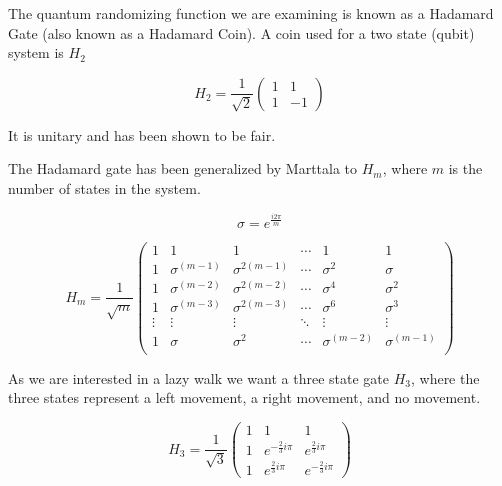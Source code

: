 \documentclass[a0,portrait]{a0poster}
\begin{document}
\begin{center}
{The quantum randomizing function we are examining is known as a Hadamard Gate (also known as a Hadamard Coin). A coin used for a two state (qubit) system is $H_2$ 

\begin{equation}
H_2 = \dfrac{1}{\sqrt{2}} \begin{pmatrix}
  1 & 1 \\
  1 & -1 
\end{pmatrix}
\label{eq:1}
\end{equation}

It is unitary and has been shown\cite{Ke:2003} to be fair. 

The Hadamard gate has been generalized by Marttala\cite{Ma:2007} to $H_m$, where $m$ is the number of states in the system. 

\begin{equation}
\sigma = e^\frac{i2\pi}{m}
\label{eq:2}
\end{equation}

\begin{equation}
H_m = \dfrac{1}{\sqrt{m}} \begin{pmatrix}
  1 & 1 & 1 & \cdots & 1 & 1 \\
  1 & \sigma^{(m-1)} & \sigma^{2(m-1)} & \cdots & \sigma^2 & \sigma \\
  1 & \sigma^{(m-2)} & \sigma^{2(m-2)} & \cdots & \sigma^4 & \sigma^2 \\
  1 & \sigma^{(m-3)} & \sigma^{2(m-3)} & \cdots & \sigma^6 & \sigma^3 \\
  \vdots  & \vdots  & \vdots  & \ddots & \vdots  & \vdots  \\
  1 & \sigma & \sigma^2 & \cdots & \sigma^{(m-2)} & \sigma^{(m-1)} \\
\end{pmatrix}
\label{eq:3}
\end{equation}

As we are interested in a lazy walk we want a three state gate $H_3$, where the three states represent a left movement, a right movement, and no movement.

\begin{equation}
H_3 = \dfrac{1}{\sqrt{3}} \begin{pmatrix}
  1 & 1 & 1 \\
  1 & e^{-\frac{2}{3}i\pi} & e^{\frac{2}{3}i\pi} \\
  1 & e^{\frac{2}{3}i\pi} & e^{-\frac{2}{3}i\pi}
\end{pmatrix}
\label{eq:4}
\end{equation}

}
\end{center}
\end{document}
